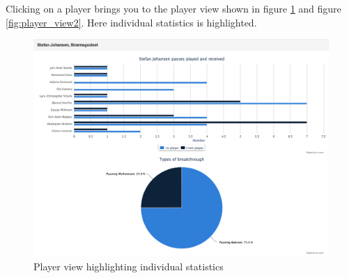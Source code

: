 Clicking on a player brings you to the player view shown in figure \ref{fig:player_view1} and figure \ref{fig:player_view2}. Here individual statistics is highlighted. 

\begin{figure}[ht!]
\centering
\includegraphics[width=1\textwidth]{images/general/player_view1.png}
\caption{Player view highlighting individual statistics}
\label{fig:player_view1}
\end{figure}

